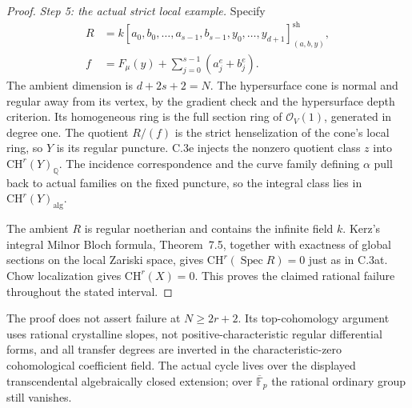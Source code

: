 \begin{proof}
\emph{Step 5: the actual strict local example.}
Specify
\[
 \begin{aligned}
 R&=k[a_0,b_0,\ldots,a_{s-1},b_{s-1},y_0,\ldots,y_{d+1}]
                        _{(a,b,y)}^{\mathrm{sh}},\\
 f&=F_\mu(y)+\sum_{j=0}^{s-1}(a_j^e+b_j^e).
 \end{aligned}
\]
The ambient dimension is $d+2s+2=N$. The hypersurface cone is
normal and regular away from its vertex, by the gradient check and
the hypersurface depth criterion. Its homogeneous ring is the full
section ring of $\mathcal O_V(1)$, generated in degree one.
The quotient $R/(f)$ is the strict henselization of the cone's local
ring, so $Y$ is its regular puncture. C.3e injects the nonzero quotient
class $z$ into $\mathrm{CH}^r(Y)_{\mathbb Q}$. The incidence
correspondence and the curve family defining $\alpha$ pull back to
actual families on the fixed puncture, so the integral class lies in
$\mathrm{CH}^r(Y)_{\mathrm{alg}}$.

The ambient $R$ is regular noetherian and contains the infinite field
$k$. Kerz's integral Milnor Bloch formula, Theorem~7.5, together with
exactness of global sections on the local Zariski space, gives
$\mathrm{CH}^r(\operatorname{Spec}R)=0$ just as in C.3at.
Chow localization gives $\mathrm{CH}^r(X)=0$. This proves the
claimed rational failure throughout the stated interval.
\end{proof}

The proof does not assert failure at $N\ge2r+2$. Its top-cohomology
argument uses rational crystalline slopes, not positive-characteristic
regular differential forms, and all transfer degrees are inverted in
the characteristic-zero cohomological coefficient field. The actual
cycle lives over the displayed transcendental algebraically closed
extension; over $\overline{\mathbb F}_p$ the rational ordinary group
still vanishes.
